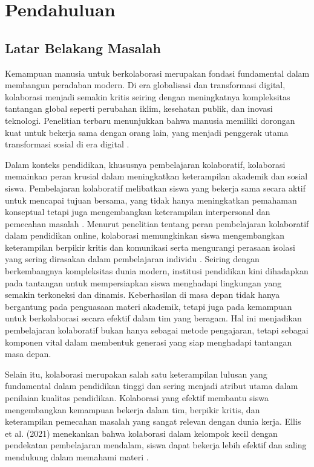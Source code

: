 \newpage
\chapter{Pendahuluan} \label{Bab I}

\section{Latar Belakang Masalah} \label{I.Latar Belakang}
Kemampuan manusia untuk berkolaborasi merupakan fondasi fundamental dalam
membangun peradaban modern. Di era globalisasi dan transformasi digital,
kolaborasi menjadi semakin kritis seiring dengan meningkatnya kompleksitas
tantangan global seperti perubahan iklim, kesehatan publik, dan inovasi
teknologi. Penelitian terbaru menunjukkan bahwa manusia memiliki dorongan kuat
untuk bekerja sama dengan orang lain, yang menjadi penggerak utama transformasi
sosial di era digital \cite{Zygmuntowski2022}.

Dalam konteks pendidikan, khususnya pembelajaran kolaboratif, kolaborasi
memainkan peran krusial dalam meningkatkan keterampilan akademik dan sosial
siswa. Pembelajaran kolaboratif melibatkan siswa yang bekerja sama secara aktif
untuk mencapai tujuan bersama, yang tidak hanya meningkatkan pemahaman
konseptual tetapi juga mengembangkan keterampilan interpersonal dan pemecahan
masalah \cite{Kotsonis2022}. Menurut penelitian tentang peran pembelajaran
kolaboratif dalam pendidikan online, kolaborasi memungkinkan siswa
mengembangkan keterampilan berpikir kritis dan komunikasi serta mengurangi
perasaan isolasi yang sering dirasakan dalam pembelajaran individu
\cite{Lu2022}. Seiring dengan berkembangnya kompleksitas dunia modern,
institusi pendidikan kini dihadapkan pada tantangan untuk mempersiapkan siswa
menghadapi lingkungan yang semakin terkoneksi dan dinamis. Keberhasilan di masa
depan tidak hanya bergantung pada penguasaan materi akademik, tetapi juga pada
kemampuan untuk berkolaborasi secara efektif dalam tim yang beragam. Hal ini
menjadikan pembelajaran kolaboratif bukan hanya sebagai metode pengajaran,
tetapi sebagai komponen vital dalam membentuk generasi yang siap menghadapi
tantangan masa depan.

Selain itu, kolaborasi merupakan salah satu keterampilan lulusan yang
fundamental dalam pendidikan tinggi dan sering menjadi atribut utama dalam
penilaian kualitas pendidikan. Kolaborasi yang efektif membantu siswa
mengembangkan kemampuan bekerja dalam tim, berpikir kritis, dan keterampilan
pemecahan masalah yang sangat relevan dengan dunia kerja. Ellis et al. (2021)
menekankan bahwa kolaborasi dalam kelompok kecil dengan pendekatan pembelajaran
mendalam, siswa dapat bekerja lebih efektif dan saling mendukung dalam memahami
materi \cite{Ellis2021}.

